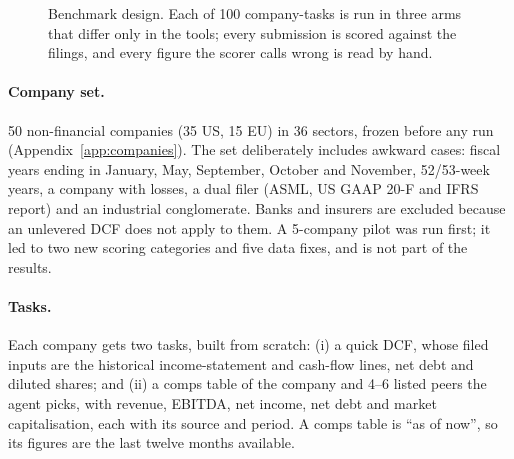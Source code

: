 \documentclass[10pt,a4paper]{article}
\begin{document}
\begin{figure}[htb]
\centering
{}
\caption{Benchmark design. Each of 100 company-tasks is run in three arms that differ only in the tools; every
submission is scored against the filings, and every figure the scorer calls wrong is read by hand.}
\label{fig:design}
\end{figure}

\paragraph{Company set.} 50 non-financial companies (35 US, 15 EU) in 36 sectors, frozen before any run
(Appendix~\ref{app:companies}). The set deliberately includes awkward cases: fiscal years ending in January, May,
September, October and November, 52/53-week years, a company with losses, a dual filer (ASML, US GAAP 20-F and IFRS
report) and an industrial conglomerate. Banks and insurers are excluded because an unlevered DCF does not apply to them. A
5-company pilot was run first; it led to two new scoring categories and five data fixes, and is not part of the
results.

\paragraph{Tasks.} Each company gets two tasks, built from scratch: (i) a quick DCF, whose filed inputs are the
historical income-statement and cash-flow lines, net debt and diluted shares; and (ii) a comps table of the company
and 4--6 listed peers the agent picks, with revenue, EBITDA, net income, net debt and market capitalisation, each
with its source and period. A comps table is ``as of now'', so its figures are the last twelve months available.
\end{document}
